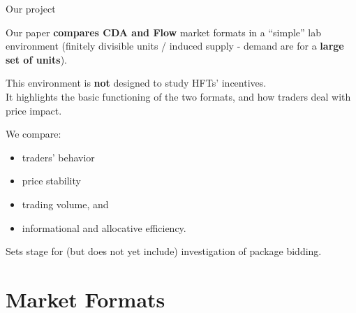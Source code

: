 \documentclass[10pt]{beamer}
\begin{document}

\begin{frame}{Our project}

Our paper \textbf{compares CDA and Flow} market formats in a ``simple'' lab environment (finitely divisible units / induced supply - demand are for a \textbf{large set of units}). 

This environment is \textbf{not} designed to study HFTs' incentives. \\ %
It highlights the basic functioning of the two formats, and how traders deal with price impact. %

We compare:
\begin{itemize}
\item traders' behavior %
\item price stability %
\item trading volume, and %
\item informational and allocative efficiency. 
\end{itemize} 

Sets stage for (but does not yet include) investigation of package bidding.

\end{frame}

\section{Market Formats}
\end{document}
